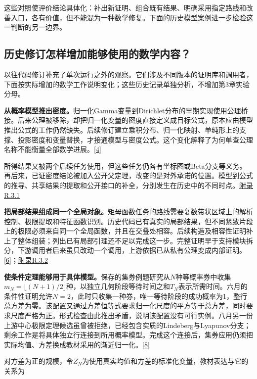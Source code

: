 这些对照使评价结论具体化：补出新证明、组合既有结果、明确采用指定路线和改善入口，各有价值，但不能混为一种数学修复。下面的历史模型案例进一步检验这一判断的另一边界。

\subsection[历史修订怎样增加能够使用的数学内容？]{\texorpdfstring{\protect\hypertarget{section-4-5}{}历史修订怎样增加能够使用的数学内容？}{历史修订怎样增加能够使用的数学内容？}}
以往代码修订补充了单次运行之外的观察。它们涉及不同版本的证明库和调用者，下面按实际增加的数学工作说明变化；这些历史记录单独分析，不增加第3章实验分母。

\textbf{从概率模型推出密度。}归一化Gamma变量到Dirichlet分布的早期实现使用公理桥接。后来公理被移除，却把归一化变量的密度直接定义成目标公式，原本应由模型推出公式的工作仍然缺失。后续修订建立乘积分布、归一化映射、单纯形上的支撑、投影密度和变量替换，才接通模型与密度公式。这个变化解释了为何单查公理名称不能衡量全部数学进展。\hyperlink{ref-4}{\mbox{[4]}}

所得结果又被两个后续任务使用，但这些任务仍各有坐标图或Beta分支等义务。再后来，已证密度结论被加入公开父定理，改变的是对外承诺的位置。模型到公式的推导、共享结果的提取和公开接口的补全，分别发生在历史中的不同时点。\href{zh-appendix.pdf\#r3-1}{附录R.3.1}

\textbf{把局部结果组成同一个全局对象。}矩母函数任务的路线需要复数带状区域上的解析控制、极限提取和特征函数识别。历史代码已有真实的局部结果，但不同紧致片段上的极限必须来自同一个全局函数，并且在交叠处相容。后续构造及相容性证明补上了整体组装；列出已有局部引理还不足以完成这一步。完整证明早于支持模块拆分，下游调用者后来虽只改动一个调用，上游依据已从私有公理变成内部证明。\hyperlink{ref-6}{\mbox{[6]}}；\href{zh-appendix.pdf\#r3-2}{附录R.3.2}

\textbf{使条件定理能够用于具体模型。}保存的集券例题研究从$N$种等概率券中收集$m_N=\lfloor(N+1)/2\rfloor$种，以独立几何阶段等待时间之和$T_N$表示所需时间。六月的条件性证明允许$N=2$，此时只收集一种券，唯一等待阶段的成功概率为1，整行总方差为零。该配置又通过方差恒等式要求归一化尺度的平方等于总方差，同时要求尺度严格为正。形式检查由此推出矛盾，说明该配置没有可行实例。八月另一份上游中心极限定理候选虽曾被拒绝，已经包含实质的Lindeberg与Lyapunov分支；剩余工作是将具体独立行连接到所用概率模型。完成这个连接后，集券应用仍须把实际均值、方差换成教材采用的渐近归一化。\hyperlink{ref-8}{\mbox{[8]}}

对方差为正的规模，令$Z_N$为使用真实均值和方差的标准化变量，教材表达与它的关系为

